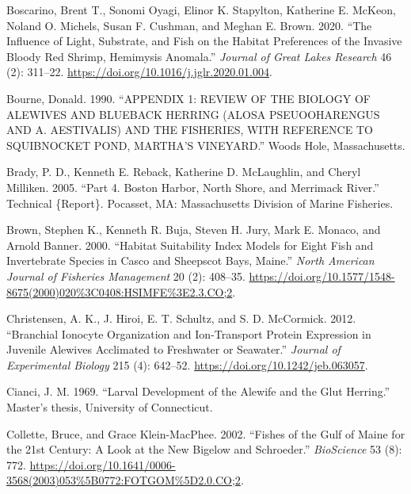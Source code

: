 \documentclass[
]{book}
\newlength{\cslhangindent}
\newlength{\cslentryspacingunit} %
\newenvironment{CSLReferences}[2] %
 {%
  \setlength{\parindent}{0pt}
  \ifodd #1
  \let\oldpar\par
  \def\par{\hangindent=\cslhangindent\oldpar}
  \fi
  \setlength{\parskip}{#2\cslentryspacingunit}
 }%
 {}
\begin{document}
\begin{CSLReferences}{1}{0}
\leavevmode{}%
Boscarino, Brent T., Sonomi Oyagi, Elinor K. Stapylton, Katherine E. McKeon, Noland O. Michels, Susan F. Cushman, and Meghan E. Brown. 2020. {``The Influence of Light, Substrate, and Fish on the Habitat Preferences of the Invasive Bloody Red Shrimp, {Hemimysis} Anomala.''} \emph{Journal of Great Lakes Research} 46 (2): 311--22. \url{https://doi.org/10.1016/j.jglr.2020.01.004}.

\leavevmode{}%
Bourne, Donald. 1990. {``{APPENDIX} 1: {REVIEW} {OF} {THE} {BIOLOGY} {OF} {ALEWIVES} {AND} {BLUEBACK} {HERRING} ({ALOSA} {PSEUOOHARENGUS} {AND} {A}. {AESTIVALIS}) {AND} {THE} {FISHERIES}, {WITH} {REFERENCE} {TO} {SQUIBNOCKET} {POND}, {MARTHA}'{S} {VINEYARD}.''} Woods Hole, Massachusetts.

\leavevmode{}%
Brady, P. D., Kenneth E. Reback, Katherine D. McLaughlin, and Cheryl Milliken. 2005. {``Part 4. {Boston} {Harbor}, {North} {Shore}, and {Merrimack} {River}.''} Technical \{Report\}. Pocasset, MA: Massachusetts Division of Marine Fisheries.

\leavevmode{}%
Brown, Stephen K., Kenneth R. Buja, Steven H. Jury, Mark E. Monaco, and Arnold Banner. 2000. {``Habitat {Suitability} {Index} {Models} for {Eight} {Fish} and {Invertebrate} {Species} in {Casco} and {Sheepscot} {Bays}, {Maine}.''} \emph{North American Journal of Fisheries Management} 20 (2): 408--35. \url{https://doi.org/10.1577/1548-8675(2000)020\%3C0408:HSIMFE\%3E2.3.CO;2}.

\leavevmode{}%
Christensen, A. K., J. Hiroi, E. T. Schultz, and S. D. McCormick. 2012. {``Branchial Ionocyte Organization and Ion-Transport Protein Expression in Juvenile Alewives Acclimated to Freshwater or Seawater.''} \emph{Journal of Experimental Biology} 215 (4): 642--52. \url{https://doi.org/10.1242/jeb.063057}.

\leavevmode{}%
Cianci, J. M. 1969. {``Larval {Development} of the Alewife and the Glut Herring.''} Master's thesis, University of Connecticut.

\leavevmode{}%
Collette, Bruce, and Grace Klein-MacPhee. 2002. {``Fishes of the {Gulf} of {Maine} for the 21st {Century}: {A} {Look} at the {New} {Bigelow} and {Schroeder}.''} \emph{BioScience} 53 (8): 772. \url{https://doi.org/10.1641/0006-3568(2003)053\%5B0772:FOTGOM\%5D2.0.CO;2}.


\end{CSLReferences}
\end{document}
